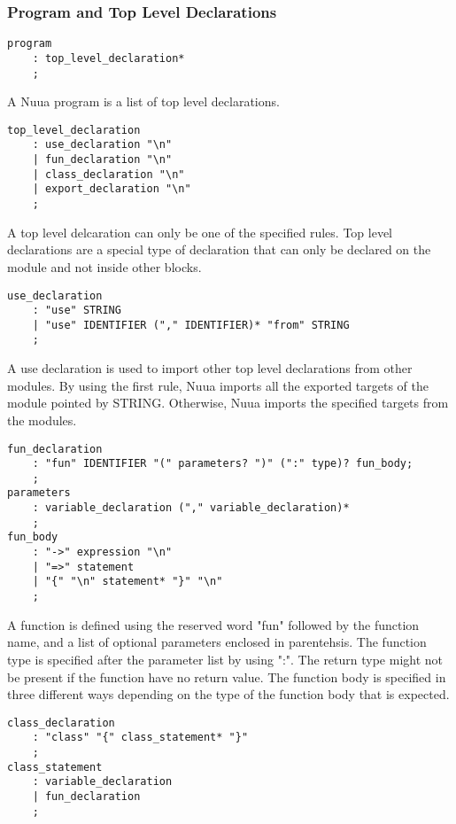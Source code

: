\subsubsection{Program and Top Level Declarations}
\label{sec:program_tld}

\begin{lstlisting}
program
    : top_level_declaration*
    ;
\end{lstlisting}

A Nuua program is a list of top level declarations.

\begin{lstlisting}
top_level_declaration
    : use_declaration "\n"
    | fun_declaration "\n"
    | class_declaration "\n"
    | export_declaration "\n"
    ;
\end{lstlisting}

A top level delcaration can only be one of the specified rules. Top level declarations are a
special type of declaration that can only be declared on the module and not inside other blocks.

\begin{lstlisting}
use_declaration
    : "use" STRING
    | "use" IDENTIFIER ("," IDENTIFIER)* "from" STRING
    ;
\end{lstlisting}

A use declaration is used to import other top level declarations from other modules. By using the first rule, Nuua imports all the
exported targets of the module pointed by STRING. Otherwise, Nuua imports the specified targets from the modules.

\begin{lstlisting}
fun_declaration
    : "fun" IDENTIFIER "(" parameters? ")" (":" type)? fun_body;
    ;
parameters
    : variable_declaration ("," variable_declaration)*
    ;
fun_body
    : "->" expression "\n"
    | "=>" statement
    | "{" "\n" statement* "}" "\n"
    ;
\end{lstlisting}

A function is defined using the reserved word "fun" followed by the function name, and a list of optional parameters enclosed in parentehsis.
The function type is specified after the parameter list by using ":". The return type might not be present if the function have no return value.
The function body is specified in three different ways depending on the type of the function body that is expected.

\begin{lstlisting}
class_declaration
    : "class" "{" class_statement* "}"
    ;
class_statement
    : variable_declaration
    | fun_declaration
    ;
\end{lstlisting}

